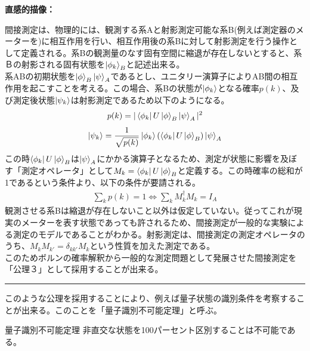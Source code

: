 \documentclass[a4paper,10.5pt]{article}
\numberwithin{equation}{section}
\newenvironment{intuitionbox}
{\begin{prooflabel}\textbf{直感的描像：}\end{prooflabel}\vspace{0.8em}}
{\par\vspace{1em}\hrule\vspace{1em}}
\begin{document}
\begin{intuitionbox}
間接測定は、物理的には、観測する系Aと射影測定可能な系B(例えば測定器のメーターを)に相互作用を行い、相互作用後の系Bに対して射影測定を行う操作として定義される。系Bの観測量のなす固有空間に縮退が存在しないとすると、系Ｂの射影される固有状態を$\ket{\phi_{k}}_{B}$と記述出来る。\\
系ABの初期状態を$\ket{\phi}_{B}\ket{\psi}_{A}$であるとし、ユニタリー演算子によりAB間の相互作用を起こすことを考える。この場合、系Bの状態が$\ket{\phi_{k}}$となる確率$p(k)$、及び測定後状態$\ket{\psi_{k}}$は射影測定であるため以下のようになる。
\begin{equation}\begin{split}
    p(k)=|\bra{\phi_{k}}U\ket{\phi}_{B}\ket{\psi}_{A}|^{2}
\end{split} \end{equation}
\begin{equation}\begin{split}
    \ket{\psi_{k}} = \frac{1}{\sqrt{p(k)}}\ket{\phi_{k}}(\bra{\phi_{k}}U\ket{\phi}_{B})\ket{\psi}_{A}
\end{split} \end{equation}
この時$\bra{\phi_{k}}U\ket{\phi}_{B}$は$\ket{\psi}_{A}$にかかる演算子となるため、測定が状態に影響を及ぼす「測定オペレータ」として$M_{k}=\bra{\phi_{k}}U\ket{\phi}_{B}$と定義する。この時確率の総和が1であるという条件より、以下の条件が要請される。
\begin{equation}\begin{split}
    \sum_{k}p(k)=1 \iff \sum_{k}M^{\dagger}_{k} M_{k}=I_{A}
\end{split} \end{equation}
観測させる系Bは縮退が存在しないこと以外は仮定していない。従ってこれが現実のメーターを表す状態であっても許されるため、間接測定が一般的な実験による測定のモデルであることがわかる。射影測定は、間接測定の測定オペレータのうち、$M_{k}M_{k'}=\delta_{kk'}M_{k}$という性質を加えた測定である。\\
このためボルンの確率解釈から一般的な測定問題として発展させた間接測定を「公理３」として採用することが出来る。
\end{intuitionbox}
このような公理を採用することにより、例えば量子状態の識別条件を考察することが出来る。このことを「量子識別不可能定理」と呼ぶ。
\begin{theorembox}{量子識別不可能定理}
非直交な状態を100パーセント区別することは不可能である。
\end{theorembox}
\end{document}
